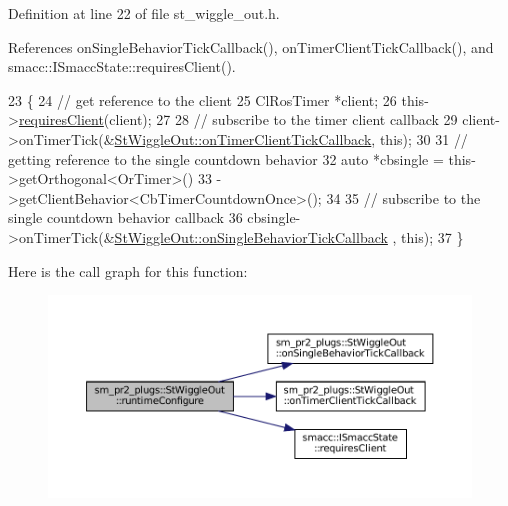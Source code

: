 Definition at line 22 of file st\+\_\+wiggle\+\_\+out.\+h.



References on\+Single\+Behavior\+Tick\+Callback(), on\+Timer\+Client\+Tick\+Callback(), and smacc\+::\+I\+Smacc\+State\+::requires\+Client().


\begin{DoxyCode}
23     \{
24         \textcolor{comment}{// get reference to the client}
25         ClRosTimer *client;
26         this->\hyperlink{classsmacc_1_1ISmaccState_a7f95c9f0a6ea2d6f18d1aec0519de4ac}{requiresClient}(client);
27 
28         \textcolor{comment}{// subscribe to the timer client callback}
29         client->onTimerTick(&\hyperlink{structsm__pr2__plugs_1_1StWiggleOut_a5a3ebd3e28a35bbcb63600cb4f5e5265}{StWiggleOut::onTimerClientTickCallback}, \textcolor{keyword}{
      this});
30 
31         \textcolor{comment}{// getting reference to the single countdown behavior}
32         \textcolor{keyword}{auto} *cbsingle = this->getOrthogonal<OrTimer>()
33                              ->getClientBehavior<CbTimerCountdownOnce>();
34 
35         \textcolor{comment}{// subscribe to the single countdown behavior callback}
36         cbsingle->onTimerTick(&\hyperlink{structsm__pr2__plugs_1_1StWiggleOut_a569b162bc13388ec2f3812bd538b5cf4}{StWiggleOut::onSingleBehaviorTickCallback}
      , \textcolor{keyword}{this});
37     \}
\end{DoxyCode}
Here is the call graph for this function\+:
\nopagebreak
\begin{figure}[H]
\begin{center}
\leavevmode
\includegraphics[width=350pt]{structsm__pr2__plugs_1_1StWiggleOut_a6fa24859d089ed61fcea478ed3b23cce_cgraph}
\end{center}
\end{figure}
\mbox{\label{structsm__pr2__plugs_1_1StWiggleOut_ad4db8d9b75e1fd0fb6641666d0b10554}} 
